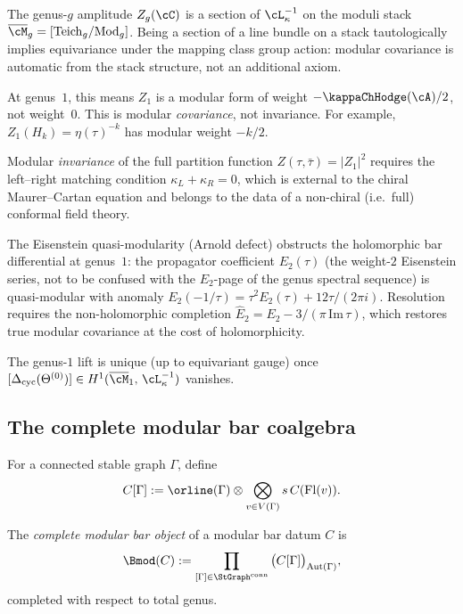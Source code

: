 \begin{remark}
\label{rem:modular-covariance-automatic}
The genus-$g$ amplitude $Z_g(\cC)$ is a section of $\cL_\kappa^{-1}$ on the moduli
stack $\overline{\cM}_g = [\mathrm{Teich}_g / \mathrm{Mod}_g]$. Being a section of a
line bundle on a stack tautologically implies equivariance under the mapping class
group action: modular covariance is automatic from the stack structure, not an
additional axiom.

At genus~$1$, this means $Z_1$ is a modular form of weight $-\kappaChHodge(\cA)/2$, not
weight~$0$. This is modular \emph{covariance}, not invariance. For example,
$Z_1(H_k) = \eta(\tau)^{-k}$ has modular weight $-k/2$.

Modular \emph{invariance} of the full partition function
$Z(\tau,\bar{\tau}) = |Z_1|^2$ requires the left--right matching condition
$\kappa_L + \kappa_R = 0$, which is external to the chiral Maurer--Cartan equation
and belongs to the data of a non-chiral (i.e.\ full) conformal field theory.

The Eisenstein quasi-modularity (Arnold defect) obstructs the holomorphic bar differential
at genus~$1$: the propagator coefficient $E_2(\tau)$ (the weight-$2$ Eisenstein series,
not to be confused with the $E_2$-page of the genus spectral sequence) is quasi-modular
with anomaly $E_2(-1/\tau) = \tau^2 E_2(\tau) + 12\tau/(2\pi i)$. Resolution requires
the non-holomorphic completion
$\widehat{E}_2 = E_2 - 3/(\pi\,\mathrm{Im}\,\tau)$, which restores true modular
covariance at the cost of holomorphicity.

The genus-$1$ lift is unique (up to equivariant gauge) once
$[\Delta_{\mathrm{cyc}}(\Theta^{(0)})] \in H^1(\overline{\cM}_1,\,\cL_\kappa^{-1})$
vanishes.
\end{remark}

\subsection{The complete modular bar coalgebra}
\label{sec:modular-bar-coalgebra}

For a connected stable graph $\Gamma$, define
\[
C[\Gamma]:=
\orline(\Gamma)\otimes\bigotimes_{v\in V(\Gamma)} s\,C(\mathrm{Fl}(v)).
\]

\begin{definition}
The \emph{complete modular bar object} of a modular bar datum $C$ is
\[
\Bmod(C):=
\prod_{[\Gamma]\in \StGraph^{\mathrm{conn}}}
\big(C[\Gamma]\big)_{\mathrm{Aut}(\Gamma)},
\]
completed with respect to total genus.
\end{definition}

